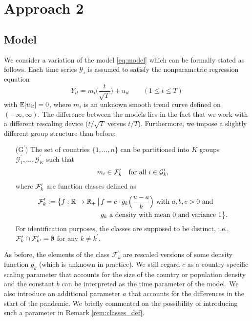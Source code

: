 \documentclass[a4paper,12pt]{article}
\numberwithin{equation}{section}
\begin{document}



\section{Approach 2}\label{subsec:diss_alt}


\subsection{Model}


We consider a variation of the model \eqref{eq:model} which can be formally stated as follows. Each time series $\mathcal{Y}_i$ is assumed to satisfy the nonparametric regression equation
\begin{equation}\label{eq:model_alt}
Y_{it} = m_i\Big(\frac{t}{\sqrt{T}}\Big) + u_{it} \qquad (1 \le t \le T) 
\end{equation}
with $\mathbb{E}[u_{it}]= 0$, where $m_i$ is an unknown smooth trend curve defined on $(-\infty, \infty)$. The difference between the models lies in the fact that we work with a different rescaling device ($t/\sqrt{T}$ versus $t/T$). Furthermore, we impose a slightly different group structure than before:
\begin{enumerate}[leftmargin=0.9cm]
\item[($\text{G}^\prime$)] The set of countries $\{1,\ldots,n\}$ can be partitioned into $K$ groups $\mathcal{G}^\prime_1,\ldots,\mathcal{G}^\prime_K$ such that 
\[ m_i \in \mathcal{F}_k^\prime \quad \text{for all } i \in \mathcal{G}^\prime_k, \]
where $\mathcal{F}^\prime_k$ are function classes defined as
\begin{align*} \mathcal{F}^\prime_k := \big\{ f:\mathbb{R} \rightarrow \mathbb{R}_{+} \,\big|\, & f = c \cdot g_k\Big(\frac{u - a}{b}\Big) \text{ with } a, b, c > 0 \text{ and } \\
& g_k \text{ a density with mean } 0 \text{ and variance } 1 \big\}.
\end{align*}
For identification purposes, the classes are supposed to be distinct, \linebreak i.e., $\mathcal{F}_k^\prime \cap \mathcal{F}_{k^\prime}^\prime = \emptyset$ for any $k \neq k^\prime$. 
\end{enumerate}
As before, the elements of the class $\mathcal{F}^\prime_k$ are rescaled versions of some density function $g_k$ (which is unknown in practice). %
We still regard $c$ as a country-specific scaling parameter that accounts for the size of the country or population density and the constant $b$ can be interpreted as the time parameter of the model. We also introduce an additional parameter $a$ that accounts for the differences in the start of the pandemic. We briefly commented on the possibility of introducing such a parameter in Remark \ref{rem:classes_def}. %
\end{document}
